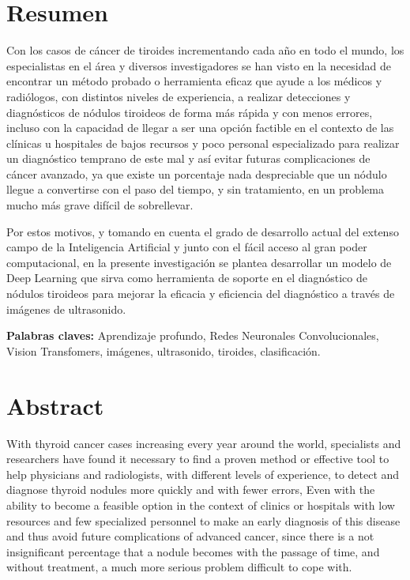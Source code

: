 
\chapter*{Resumen}

Con los casos de cáncer de tiroides incrementando cada año en todo el mundo, los especialistas en el área y diversos investigadores se han visto en la necesidad de encontrar un método probado o herramienta eficaz que ayude a los médicos y radiólogos, con distintos niveles de experiencia, a realizar detecciones y diagnósticos de nódulos tiroideos de forma más rápida y con menos errores, incluso con la capacidad de llegar a ser una opción factible en el contexto de las clínicas u hospitales de bajos recursos y poco personal especializado para realizar un diagnóstico temprano de este mal y así evitar futuras complicaciones de cáncer avanzado, ya que existe un porcentaje nada despreciable que un nódulo llegue a convertirse con el paso del tiempo, y sin tratamiento, en un problema mucho más grave difícil de sobrellevar. 

Por estos motivos, y tomando en cuenta el grado de desarrollo actual del extenso campo de la Inteligencia Artificial y junto con el fácil acceso al gran poder computacional, en la presente investigación se plantea desarrollar un modelo de Deep Learning que sirva como herramienta de soporte en el diagnóstico de nódulos tiroideos para mejorar la eficacia y eficiencia del diagnóstico a través de imágenes de ultrasonido.
\newline

\textbf{Palabras claves: } Aprendizaje profundo, Redes Neuronales Convolucionales, Vision Transfomers, imágenes, ultrasonido, tiroides, clasificación.

\clearpage
\chapter*{Abstract}
With thyroid cancer cases increasing every year around the world,  specialists and researchers have found it necessary to find a proven method or effective tool to help physicians and radiologists, with different levels of experience, to detect and diagnose thyroid nodules more quickly and with fewer errors, Even with the ability to become a feasible option in the context of clinics or hospitals with low resources and few specialized personnel to make an early diagnosis of this disease and thus avoid future complications of advanced cancer, since there is a not insignificant percentage that a nodule becomes with the passage of time, and without treatment, a much more serious problem difficult to cope with. 

